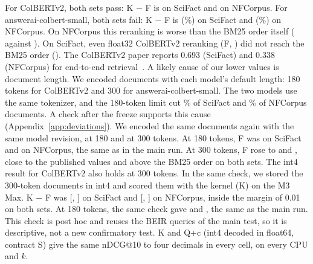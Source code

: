 For ColBERTv2, both sets pass: K $-$ F is  on SciFact and  on NFCorpus.
For answerai-colbert-small, both sets fail: K $-$ F is  (\%) on SciFact and  (\%) on NFCorpus.
On NFCorpus this reranking is worse than the BM25 order itself ( against ).
On SciFact, even float32 ColBERTv2 reranking (F, ) did not reach the BM25 order ().
The ColBERTv2 paper reports 0.693 (SciFact) and 0.338 (NFCorpus) for end-to-end retrieval~\cite{santhanam2022colbertv2}.
A likely cause of our lower values is document length.
We encoded documents with each model's default length: 180 tokens for ColBERTv2 and 300 for answerai-colbert-small.
The two models use the same tokenizer, and the 180-token limit cut \% of SciFact and \% of NFCorpus documents.
A check after the freeze supports this cause (Appendix~\ref{app:deviations}).
We encoded the same documents again with the same model revision, at 180 and at 300 tokens.
At 180 tokens, F was  on SciFact and  on NFCorpus, the same as in the main run.
At 300 tokens, F rose to  and , close to the published values and above the BM25 order on both sets.
The int4 result for ColBERTv2 also holds at 300 tokens.
In the same check, we stored the 300-token documents in int4 and scored them with the kernel (K) on the M3 Max.
K $-$ F was  [, ] on SciFact and  [, ] on NFCorpus, inside the margin of 0.01 on both sets.
At 180 tokens, the same check gave  and , the same as the main run.
This check is post hoc and reuses the BEIR queries of the main test, so it is descriptive, not a new confirmatory test.
K and Q+c (int4 decoded in float64, contract S) give the same nDCG@10 to four decimals in every cell, on every CPU and $k$.

\begin{table}[!htbp]
\centering\scriptsize
\setlength{\tabcolsep}{3pt}
\caption{Primary non-inferiority tests (fresh held-out; $k = 100$; $\delta = 0.01$ absolute nDCG@10; paired bootstrap over queries, 10,000 resamples, seed 42; Holm over the four tests). Lower 95\% bound of K $-$ F, Holm-adjusted $p$, and the verdict (\cmark: no material loss). The test ran on each of the five CPUs and gave these values on every one, because the kernel's nDCG@10 is the same on all of them.}
\label{tab:primary}
\end{table}

